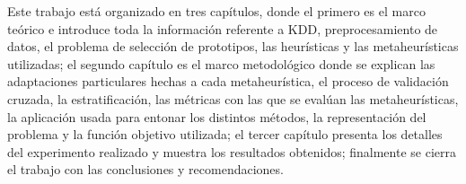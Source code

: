 Este trabajo está organizado en tres capítulos, donde el primero es el marco teórico e introduce toda la información referente a KDD, preprocesamiento de datos, el problema de selección de prototipos, las heurísticas y las metaheurísticas utilizadas; el segundo capítulo es el marco metodológico donde se explican las adaptaciones particulares hechas a cada metaheurística, el proceso de validación cruzada, la estratificación, las métricas con las que se evalúan las metaheurísticas, la aplicación usada para entonar los distintos métodos, la representación del problema y la función objetivo utilizada; el tercer capítulo presenta los detalles del experimento realizado y muestra los resultados obtenidos; finalmente se cierra el trabajo con las conclusiones y recomendaciones.